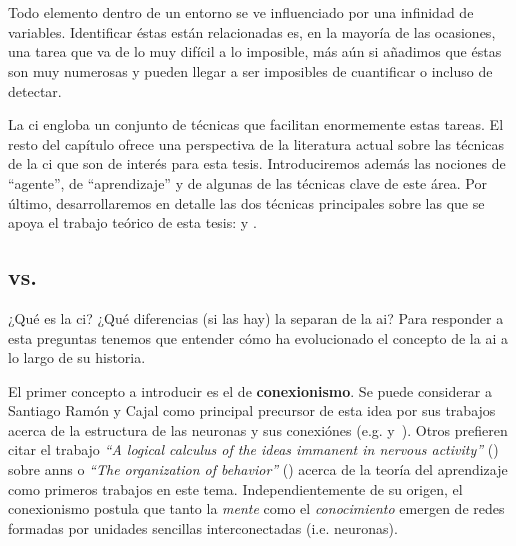 \chapter{}
\label{ch:sota-ci}

Todo elemento dentro de un entorno se ve influenciado por una infinidad de variables. Identificar éstas están relacionadas es, en la mayoría de las ocasiones, una tarea que va de lo muy difícil a lo imposible, más aún si añadimos que éstas son muy numerosas y pueden llegar a ser imposibles de cuantificar o incluso de detectar.

La \acrfull{ci} engloba un conjunto de técnicas que facilitan enormemente estas tareas. El resto del capítulo ofrece una perspectiva de la literatura actual sobre las técnicas de la \gls{ci} que son de interés para esta tesis. Introduciremos además las nociones de \enquote{agente}, de \enquote{aprendizaje} y de algunas de las técnicas clave de este área. Por último, desarrollaremos en detalle las dos técnicas principales sobre las que se apoya el trabajo teórico de esta tesis:  y .

\section{ vs. }

¿Qué es la \gls{ci}? ¿Qué diferencias (si las hay) la separan de la \acrfull{ai}? Para responder a esta preguntas tenemos que entender cómo ha evolucionado el concepto de la \ac{ai} a lo largo de su historia.

El primer concepto a introducir es el de \textbf{conexionismo}. Se puede considerar a Santiago Ramón y Cajal como principal precursor de esta idea por sus trabajos acerca de la estructura de las neuronas y sus conexiónes (e.g. \cite{y1888estructura} y~\cite{ramon1904textura}). Otros prefieren citar el trabajo \textit{\enquote{A logical calculus of the ideas immanent in nervous activity}} (\cite{McCulloch1943}) sobre \glspl{ann} o \textit{\enquote{The organization of behavior}} (\cite{hebb19680}) acerca de la teoría del aprendizaje como primeros trabajos en este tema. Independientemente de su origen, el conexionismo postula que tanto la \textit{mente} como el \textit{conocimiento} emergen de redes formadas por unidades sencillas interconectadas (i.e. neuronas).



